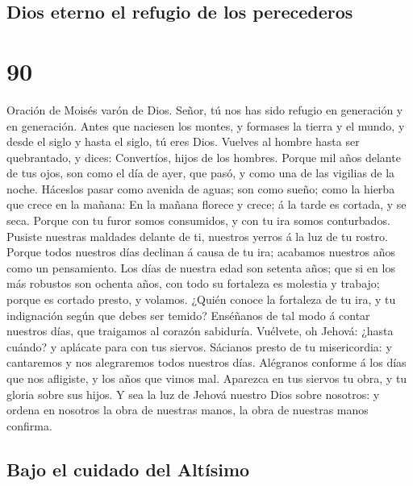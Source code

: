 \hypertarget{dios-eterno-el-refugio-de-los-perecederos}{%
\subsection{Dios eterno el refugio de los
perecederos}\label{dios-eterno-el-refugio-de-los-perecederos}}

\hypertarget{section-89}{%
\section{90}\label{section-89}}

 Oración de Moisés varón de Dios. Señor, tú nos has sido
refugio en generación y en generación.  Antes que naciesen
los montes, y formases la tierra y el mundo, y desde el siglo y hasta el
siglo, tú eres Dios.  Vuelves al hombre hasta ser
quebrantado, y dices: Convertíos, hijos de los hombres. 
Porque mil años delante de tus ojos, son como el día de ayer, que pasó,
y como una de las vigilias de la noche.  Háceslos pasar
como avenida de aguas; son como sueño; como la hierba que crece en la
mañana:  En la mañana florece y crece; á la tarde es
cortada, y se seca.  Porque con tu furor somos consumidos,
y con tu ira somos conturbados.  Pusiste nuestras maldades
delante de ti, nuestros yerros á la luz de tu rostro. 
Porque todos nuestros días declinan á causa de tu ira; acabamos nuestros
años como un pensamiento.  Los días de nuestra edad son
setenta años; que si en los más robustos son ochenta años, con todo su
fortaleza es molestia y trabajo; porque es cortado presto, y volamos.
 ¿Quién conoce la fortaleza de tu ira, y tu indignación
según que debes ser temido?  Enséñanos de tal modo á
contar nuestros días, que traigamos al corazón sabiduría.
 Vuélvete, oh Jehová: ¿hasta cuándo? y aplácate para con
tus siervos.  Sácianos presto de tu misericordia: y
cantaremos y nos alegraremos todos nuestros días. 
Alégranos conforme á los días que nos afligiste, y los años que vimos
mal.  Aparezca en tus siervos tu obra, y tu gloria sobre
sus hijos.  Y sea la luz de Jehová nuestro Dios sobre
nosotros: y ordena en nosotros la obra de nuestras manos, la obra de
nuestras manos confirma.

\hypertarget{bajo-el-cuidado-del-altuxedsimo}{%
\subsection{Bajo el cuidado del
Altísimo}\label{bajo-el-cuidado-del-altuxedsimo}}

